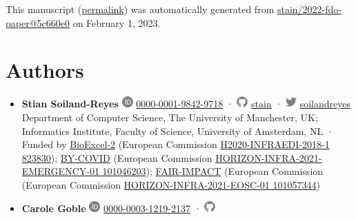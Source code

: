 This manuscript
(\href{https://stain.github.io/2022-fdo-paper/v/5c660e0d407c65b4f669383e77cc59e770e73c12/}{permalink})
was automatically generated
from \href{https://github.com/stain/2022-fdo-paper/tree/5c660e0d407c65b4f669383e77cc59e770e73c12}{stain/2022-fdo-paper@5c660e0}
on February 1, 2023.

\hypertarget{authors}{%
\section*{Authors}\label{authors}}

\begin{itemize}
\item
  \textbf{Stian Soiland-Reyes}
  \includegraphics[width=0.16667in,height=0.16667in]{images/orcid.svg}
  \href{https://orcid.org/0000-0001-9842-9718}{0000-0001-9842-9718}
  · \includegraphics[width=0.16667in,height=0.16667in]{images/github.svg}
  \href{https://github.com/stain}{stain}
  · \includegraphics[width=0.16667in,height=0.16667in]{images/twitter.svg}
  \href{https://twitter.com/soilandreyes}{soilandreyes}
  Department of Computer Science, The University of Manchester, UK; Informatics Institute, Faculty of Science, University of Amsterdam, NL
  · Funded by \href{https://bioexcel.eu/}{BioExcel-2} (European Commission \href{https://cordis.europa.eu/project/id/823830}{H2020-INFRAEDI-2018-1 823830}); \href{https://by-covid.eu/}{BY-COVID} (European Commission \href{https://cordis.europa.eu/project/id/101046203}{HORIZON-INFRA-2021-EMERGENCY-01 101046203}); \href{http://www.fair-impact.eu/}{FAIR-IMPACT} (European Commission (European Commission \href{https://cordis.europa.eu/project/id/101057344}{HORIZON-INFRA-2021-EOSC-01 101057344})
\item
  \textbf{Carole Goble}
  \includegraphics[width=0.16667in,height=0.16667in]{images/orcid.svg}
  \href{https://orcid.org/0000-0003-1219-2137}{0000-0003-1219-2137}
  · \includegraphics[width=0.16667in,height=0.16667in]{images/github.svg}

\end{itemize}
